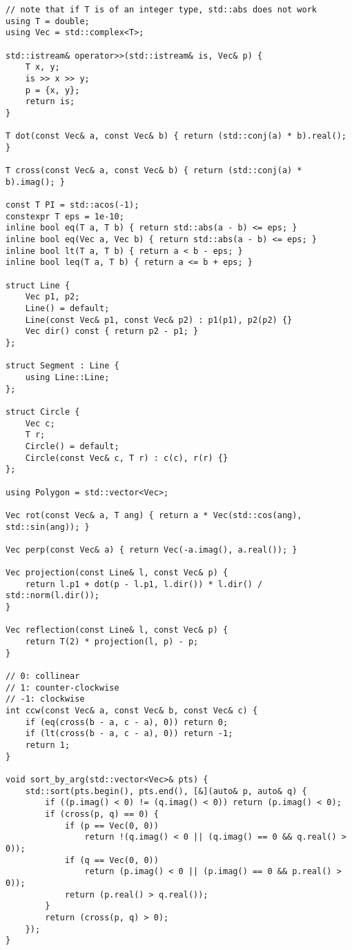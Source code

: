 \begin{lstlisting}
// note that if T is of an integer type, std::abs does not work
using T = double;
using Vec = std::complex<T>;

std::istream& operator>>(std::istream& is, Vec& p) {
    T x, y;
    is >> x >> y;
    p = {x, y};
    return is;
}

T dot(const Vec& a, const Vec& b) { return (std::conj(a) * b).real(); }

T cross(const Vec& a, const Vec& b) { return (std::conj(a) * b).imag(); }

const T PI = std::acos(-1);
constexpr T eps = 1e-10;
inline bool eq(T a, T b) { return std::abs(a - b) <= eps; }
inline bool eq(Vec a, Vec b) { return std::abs(a - b) <= eps; }
inline bool lt(T a, T b) { return a < b - eps; }
inline bool leq(T a, T b) { return a <= b + eps; }

struct Line {
    Vec p1, p2;
    Line() = default;
    Line(const Vec& p1, const Vec& p2) : p1(p1), p2(p2) {}
    Vec dir() const { return p2 - p1; }
};

struct Segment : Line {
    using Line::Line;
};

struct Circle {
    Vec c;
    T r;
    Circle() = default;
    Circle(const Vec& c, T r) : c(c), r(r) {}
};

using Polygon = std::vector<Vec>;

Vec rot(const Vec& a, T ang) { return a * Vec(std::cos(ang), std::sin(ang)); }

Vec perp(const Vec& a) { return Vec(-a.imag(), a.real()); }

Vec projection(const Line& l, const Vec& p) {
    return l.p1 + dot(p - l.p1, l.dir()) * l.dir() / std::norm(l.dir());
}

Vec reflection(const Line& l, const Vec& p) {
    return T(2) * projection(l, p) - p;
}

// 0: collinear
// 1: counter-clockwise
// -1: clockwise
int ccw(const Vec& a, const Vec& b, const Vec& c) {
    if (eq(cross(b - a, c - a), 0)) return 0;
    if (lt(cross(b - a, c - a), 0)) return -1;
    return 1;
}

void sort_by_arg(std::vector<Vec>& pts) {
    std::sort(pts.begin(), pts.end(), [&](auto& p, auto& q) {
        if ((p.imag() < 0) != (q.imag() < 0)) return (p.imag() < 0);
        if (cross(p, q) == 0) {
            if (p == Vec(0, 0))
                return !(q.imag() < 0 || (q.imag() == 0 && q.real() > 0));
            if (q == Vec(0, 0))
                return (p.imag() < 0 || (p.imag() == 0 && p.real() > 0));
            return (p.real() > q.real());
        }
        return (cross(p, q) > 0);
    });
}
\end{lstlisting}

